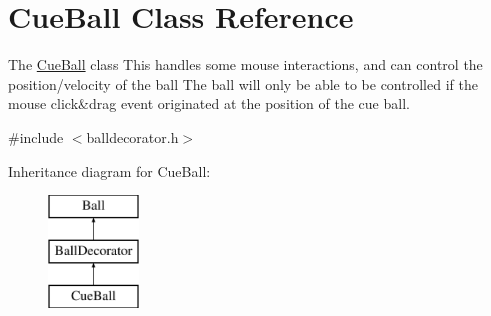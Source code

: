 \hypertarget{class_cue_ball}{}\section{Cue\+Ball Class Reference}
\label{class_cue_ball}


The \mbox{\hyperlink{class_cue_ball}{Cue\+Ball}} class This handles some mouse interactions, and can control the position/velocity of the ball The ball will only be able to be controlled if the mouse click\&drag event originated at the position of the cue ball.  




{\ttfamily \#include $<$balldecorator.\+h$>$}

Inheritance diagram for Cue\+Ball\+:\begin{figure}[H]
\begin{center}
\leavevmode
\includegraphics[height=3.000000cm]{class_cue_ball}
\end{center}
\end{figure}
